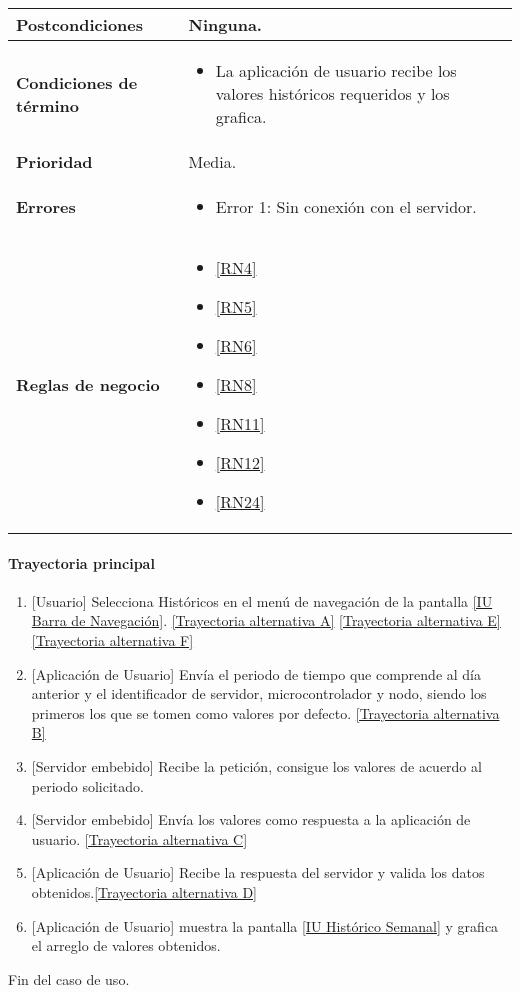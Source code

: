 \begin{longtable}{|J{5cm}|J{10.3cm}|}
	\textbf{Postcondiciones} &
		Ninguna.\\ \hline
	\textbf{Condiciones de término} & 
		\begin{itemize}
			\item La aplicación de usuario recibe los valores históricos requeridos y los grafica.
		\end{itemize} \\ \hline 
	\textbf{Prioridad} & 
		Media. \\ \hline
	\textbf{Errores} & 
		\begin{itemize}
		    \item \label{CUU1.3:Error1} Error 1: Sin conexión con el servidor.
		\end{itemize} \\ \hline
	\textbf{Reglas de negocio} & 
		\begin{itemize}
		    \item \ref{RN4}
		    \item \ref{RN5}
		    \item \ref{RN6}
		    \item \ref{RN8}
			\item \ref{RN11}
			\item \ref{RN12}
			\item \ref{RN24}
		\end{itemize} \\ \hline
\end{longtable}

\paragraph{Trayectoria principal}
    \label{SUB-U-CU1.3:TP}
	\begin{enumerate}
	    \item {[Usuario]} Selecciona Históricos en el menú de navegación de la pantalla \hyperref[fig:Barra de navegacion]{[IU Barra de Navegación]}. \hyperref[SUB-U-CU1.3:TA]{[Trayectoria alternativa A]} \hyperref[SUB-U-CU1.3:TE]{[Trayectoria alternativa E]} 
	    \hyperref[SUB-U-CU1.3:TF]{[Trayectoria alternativa F]} 
		\item {[Aplicación de Usuario]} Envía el periodo de tiempo que comprende al día anterior y el identificador de servidor, microcontrolador y nodo, siendo los primeros los que se tomen como valores por defecto. \hyperref[SUB-U-CU1.3:TB]{[Trayectoria alternativa B]} 
		\item {[Servidor embebido]} Recibe la petición, consigue los valores de acuerdo al periodo solicitado. 
		\item {[Servidor embebido]} Envía los valores como respuesta a la aplicación de usuario. \hyperref[SUB-U-CU1.3:TC]{[Trayectoria alternativa C]}
        \item {[Aplicación de Usuario]} Recibe la respuesta del servidor y valida los datos obtenidos.\hyperref[SUB-U-CU1.3:TD]{[Trayectoria alternativa D]}
        \item {[Aplicación de Usuario]} muestra la pantalla \hyperref[fig:Historico semanal]{[IU Histórico Semanal]} y grafica el arreglo de valores obtenidos. 
	\end{enumerate}
	Fin del caso de uso.

